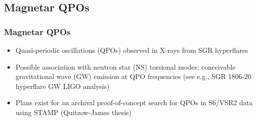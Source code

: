 \documentclass{beamer}
\def\gw#1{gravitational wave#1 (GW#1)\gdef\gw{GW}}
\def\ns#1{neutron star#1 (NS#1)\gdef\ns{NS}}
\begin{document}
\subsection{Magnetar QPOs}
\begin{frame}\frametitle{Magnetar QPOs} 
    \begin{itemize}
        \item Quasi-periodic oscillations (QPOs) observed in X-rays from SGR
            hyperflares
        \item Possible association with \ns{} torsional modes; conceivable \gw{}
            emission at QPO frequencies (see e.g., SGR 1806-20 hyperflare
            \gw{} LIGO analysis)
        \item Plans exist for an archival proof-of-concept search for QPOs in
            S6/VSR2 data using \textsc{STAMP} (Quitzow-James thesis)
\end{itemize}
\end{frame}
\end{document}
